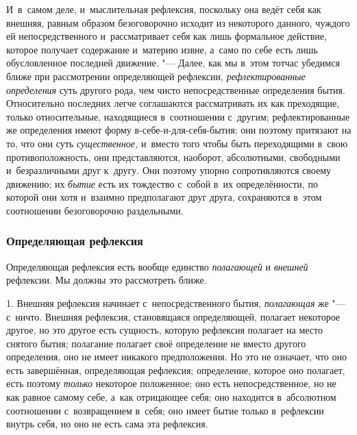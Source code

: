 И~в~самом деле, и~мыслительная рефлексия, поскольку она ведёт себя как
внешняя, равным образом безоговорочно исходит из некоторого данного,
чуждого ей непосредственного и~рассматривает себя как лишь формальное
действие, которое получает содержание и~материю извне, а~само по себе есть
лишь обусловленное последней движение. "--- Далее, как мы в~этом тотчас
убедимся ближе при рассмотрении определяющей рефлексии,
{\em рефлектированные определения} суть другого рода,
чем чисто непосредственные определения бытия. Относительно последних легче
соглашаются рассматривать их как преходящие, только относительные,
находящиеся в~соотношении с~другим; рефлектированные же определения имеют
форму в-себе-и-для-себя-бытия; они поэтому притязают на то, что они суть
{\em существенное,} и~вместо того чтобы быть
переходящими в~свою противоположность, они представляются, наоборот,
абсолютными, свободными и~безразличными друг к~другу. Они поэтому упорно
сопротивляются своему движению; их {\em бытие} есть их
тождество с~собой в~их определённости, по которой они хотя и~взаимно
предполагают друг друга, сохраняются в~этом соотношении безоговорочно
раздельными.

\subsubsection{Определяющая рефлексия}
Определяющая рефлексия есть вообще единство
{\em полагающей} и {\em внешней}
рефлексии. Мы должны это рассмотреть ближе.

1. Внешняя рефлексия начинает с~непосредственного бытия,
{\em полагающая} же "--- с~ничто. Внешняя рефлексия,
становящаяся определяющей, полагает некоторое другое, но это другое есть
сущность, которую рефлексия полагает на место снятого бытия; полагание
полагает своё определение не вместо другого определения, оно не имеет
никакого предположения. Но это не означает, что оно есть завершённая,
определяющая рефлексия; определение, которое оно полагает, есть поэтому
{\em только} некоторое положенное; оно есть
непосредственное, но не как равное самому себе, а~как отрицающее себя; оно
находится в~абсолютном соотношении с~возвращением в~себя; оно имеет бытие
только в~рефлексии внутрь себя, но оно не есть сама эта рефлексия.


